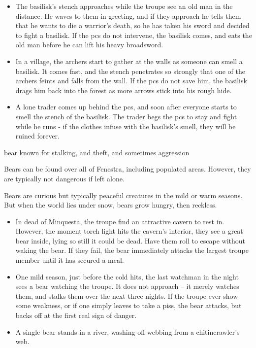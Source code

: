 \begin{multicols}{2}
\begin{itemize}
  \item{The basilisk's stench approaches while the troupe see an old man in the distance.
  He waves to them in greeting, and if they approach he tells them that he wants to die a warrior's death, so he has taken his sword and decided to fight a basilisk.
  If the \glspl{pc} do not intervene, the basilisk comes, and eats the old man before he can lift his heavy broadsword.}
  \item
  In a village, the archers start to gather at the walls as someone can smell a basilisk.
  It comes fast, and the stench penetrates so strongly that one of the archers feints and falls from the wall.
  If the \glspl{pc} do not save him, the basilisk drags him back into the forest as more arrows stick into his rough hide.
  \item
  A lone trader comes up behind the \glspl{pc}, and soon after everyone starts to smell the stench of the basilisk.
  The trader begs the \glspl{pc} to stay and fight while he runs - if the clothes infuse with the basilisk's smell, they will be ruined forever.
\end{itemize}

  {bear}%
  {known for stalking, and theft, and sometimes aggression}%

Bears can be found over all of Fenestra, including populated areas.
However, they are typically not dangerous if left alone.

\bear

\showEnc
Bears are curious but typically peaceful creatures in the mild or warm seasons.
But when the world lies under snow, bears grow hungry, then reckless.

\begin{itemize}
  \item
  In dead of Minquesta, the troupe find an attractive cavern to rest in.
  However, the moment torch light hits the cavern's interior, they see a great bear inside, lying so still it could be dead.
  Have them roll  to escape without waking the bear.
  If they fail, the bear immediately attacks the largest troupe member until it has secured a meal.
  \item
  One mild season, just before the cold hits, the last watchman in the night sees a bear watching the troupe.
  It does not approach -- it merely watches them, and stalks them over the next three nights.
  If the troupe ever show some weakness, or if one simply leaves to take a piss, the bear attacks, but backs off at the first real sign of danger.
  \item
  A single bear stands in a river, washing off webbing from a chitincrawler's web.
\end{itemize}


\end{multicols}
